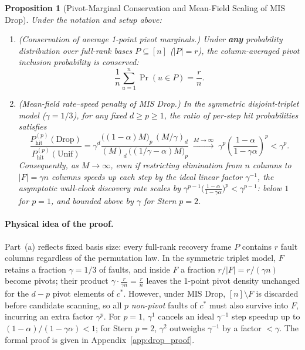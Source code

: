 \documentclass[12pt]{article}
\newtheorem{proposition}{Proposition}
\theoremstyle{definition}
\begin{document}
\begin{proposition}[Pivot-Marginal Conservation and Mean-Field Scaling of MIS Drop]\label{prop:mis_drop}
Under the notation and setup above:
\begin{enumerate}[label=(\alph*)]
  \item \emph{(Conservation of average 1-point pivot marginals.)} Under \textbf{any} probability distribution over
    full-rank bases $P \subseteq [n]$ ($|P| = r$), the column-averaged pivot inclusion probability is conserved:
    \begin{equation}\label{eq:marginal_conservation}
      \frac{1}{n} \sum_{u=1}^n \Pr(u \in P) = \frac{r}{n}.
    \end{equation}
  \item \emph{(Mean-field rate--speed penalty of MIS Drop.)} In the symmetric disjoint-triplet model ($\gamma =
    1/3$), for any fixed $d \ge p \ge 1$, the ratio of per-step hit probabilities satisfies
    \begin{equation}\label{eq:drop_hit_ratio}
      \frac{P_{\mathrm{hit}}^{(p)}(\mathrm{Drop})}{P_{\mathrm{hit}}^{(p)}(\mathrm{Unif})}
      = \gamma^d \frac{\bigl((1 - \alpha) M\bigr)_p\,(M/\gamma)_d}{(M)_d\,\bigl((1/\gamma - \alpha) M\bigr)_p}
      \;\xrightarrow{M \to \infty}\;
      \gamma^p \left(\frac{1 - \alpha}{1 - \gamma \alpha}\right)^p < \gamma^p.
    \end{equation}
    Consequently, as $M \to \infty$, even if restricting elimination from $n$ columns to $|F| = \gamma n$ columns
    speeds up each step by the ideal linear factor $\gamma^{-1}$, the asymptotic wall-clock discovery rate scales by
    $\gamma^{p-1} \bigl(\frac{1-\alpha}{1-\gamma\alpha}\bigr)^p < \gamma^{p-1}$: below $1$ for $p = 1$, and bounded
    above by $\gamma$ for Stern $p = 2$.
\end{enumerate}
\end{proposition}

\paragraph{Physical idea of the proof.}
Part~(a) reflects fixed basis size: every full-rank recovery frame $P$ contains $r$ fault columns regardless of the
permutation law. In the symmetric triplet model, $F$ retains a fraction $\gamma = 1/3$ of faults, and inside $F$ a
fraction $r / |F| = r / (\gamma n)$ become pivots; their product $\gamma \cdot \frac{r}{\gamma n} = \frac{r}{n}$
leaves the 1-point pivot density unchanged for the $d - p$ pivot elements of $c^*$. However, under MIS Drop, $[n]
\setminus F$ is discarded before candidate scanning, so all $p$ \emph{non-pivot} faults of $c^*$ must also survive
into $F$, incurring an extra factor $\gamma^p$. For $p = 1$, $\gamma^1$ cancels an ideal $\gamma^{-1}$ step
speedup up to $(1 - \alpha)/(1 - \gamma\alpha) < 1$; for Stern $p = 2$, $\gamma^2$ outweighs $\gamma^{-1}$ by a
factor $< \gamma$. The formal proof is given in Appendix~\ref{app:drop_proof}.
\end{document}
